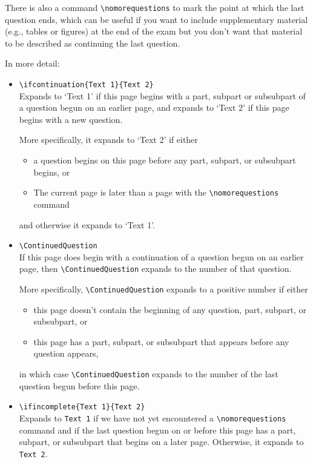 \documentclass[12pt]{exam}
\begin{document}
There is also a command \verb"\nomorequestions" to mark the point at
which the last question ends, which can be useful if you want to
include supplementary material (e.g., tables or figures) at the end of
the exam but you don't want that material to be described as
continuing the last question.

\medskip

In more detail:
\begin{itemize}
\item \verb"\ifcontinuation{Text 1}{Text 2}"\\
  Expands to `Text 1' if this page begins with a part, subpart or
  subsubpart of a question begun on an earlier page, and expands to
  `Text 2' if this page begins with a new question.
  
  More specifically, it expands to `Text 2' if either
  \begin{itemize}
  \item a question begins on this page before any part, subpart, or
    subsubpart begins, or
  \item The current page is later than a page with the
    \verb"\nomorequestions" command
  \end{itemize}
  and otherwise it expands to `Text 1'.

\item \verb"\ContinuedQuestion"\\
  If this page does begin with a continuation of a question begun on
  an earlier page, then \verb"\ContinuedQuestion" expands to the
  number of that question.
  
  More specifically, \verb"\ContinuedQuestion" expands to a positive
  number if either
  \begin{itemize}
  \item this page doesn't contain the beginning of any question, part,
    subpart, or subsubpart, or
  \item this page has a part, subpart, or subsubpart that appears
    before any question appears,
  \end{itemize}
  in which case \verb"\ContinuedQuestion" expands to the number of the
  last question begun before this page.
  
\item \verb"\ifincomplete{Text 1}{Text 2}"\\
  Expands to \verb"Text 1" if we have not yet encountered a
  \verb"\nomorequestions" command and if the last question begun on or
  before this page has a part, subpart, or subsubpart that begins on a
  later page. Otherwise, it expands to \verb"Text 2".
  

\end{itemize}
\end{document}
